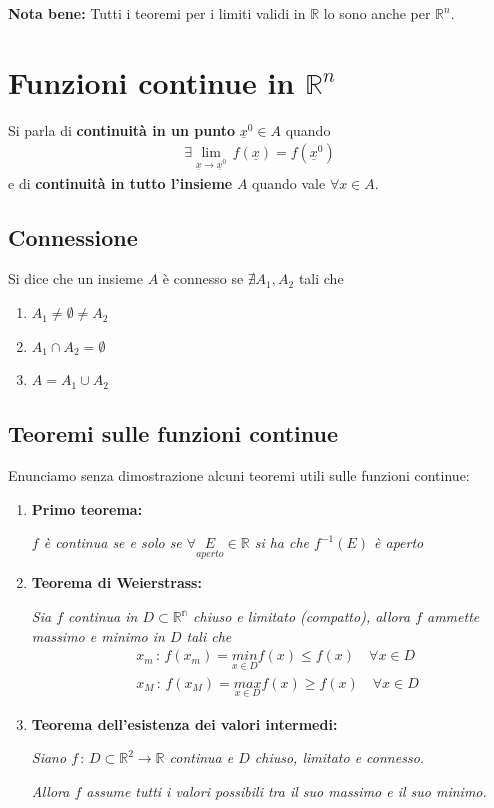 \textbf{Nota bene:} Tutti i teoremi per i limiti validi in $\mathbb{R}$ lo sono anche per $\mathbb{R}^n$.

\section{Funzioni continue in $\mathbb{R}^n$}

Si parla di \textbf{continuità in un punto} $\underline{x}^0\in A$ quando 
\begin{align}
\exists \underset{\underline{x}\rightarrow\underline{x}^0}{\lim} \, f(\underline{x})= f(\underline{x}^0)
\end{align} 
e di \textbf{continuità in tutto l'insieme} $A$ quando vale $\forall x\in A$.

\subsection{Connessione}

Si dice che un insieme $A$ è connesso se $\nexists A_1,A_2$ tali che
\begin{enumerate}
	\item $A_1\neq \emptyset \neq A_2$
	\item $A_1\cap A_2=\emptyset$
	\item $A= A_1\cup A_2$
\end{enumerate}

\subsection{Teoremi sulle funzioni continue}

Enunciamo senza dimostrazione alcuni teoremi utili sulle funzioni continue:
\begin{enumerate}
	\item \textbf{Primo teorema:}
	
	\textit{$f$ è continua se e solo se $\forall \underset{aperto}{E} \in \mathbb{R}$ si ha che $f^{-1}(E)$ è aperto}
	
	\item \textbf{Teorema di Weierstrass:}
	
	\textit{Sia $f$ continua in $D\subset \mathbb{R^n}$ chiuso e limitato (compatto), allora $f$ ammette massimo e minimo in $D$ tali che}
	\begin{align}
	{}&x_m \, : \, f(x_m)=\underset{x\in D}{min}f(x)\leq f(x) \quad \forall x \in D \\
	&x_M \, : \, f(x_M)=\underset{x\in D}{max}f(x)\geq f(x) \quad \forall x \in D
	\end{align}
	
	\item \textbf{Teorema dell'esistenza dei valori intermedi:}
	
	\textit{Siano $f \, : \, D\subset \mathbb{R}^2 \longrightarrow \mathbb{R}$ continua e $D$ chiuso, limitato e connesso.}
	
	\textit{Allora $f$ assume tutti i valori possibili tra il suo massimo e il suo minimo.}
\end{enumerate}

